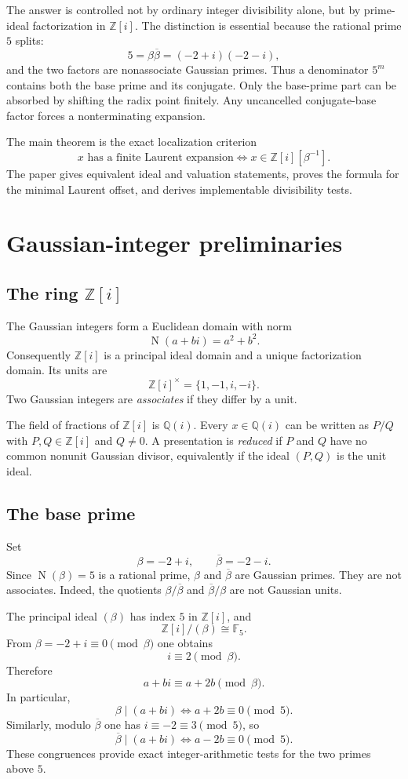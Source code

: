 \documentclass[11pt]{article}
\theoremstyle{definition}
\newcommand{\Zi}{\mathbb{Z}[i]}
\newcommand{\Qi}{\mathbb{Q}(i)}
\newcommand{\Ffive}{\mathbb{F}_5}
\newcommand{\Norm}{\operatorname{N}}
\begin{document}
The answer is controlled not by ordinary integer divisibility alone, but by prime-ideal factorization in $\Zi$.  The distinction is essential because the rational prime $5$ splits:
\[
5=\beta\overline\beta=(-2+i)(-2-i),
\]
and the two factors are nonassociate Gaussian primes.  Thus a denominator $5^m$ contains both the base prime and its conjugate.  Only the base-prime part can be absorbed by shifting the radix point finitely.  Any uncancelled conjugate-base factor forces a nonterminating expansion.

The main theorem is the exact localization criterion
\[
\boxed{
 x\text{ has a finite Laurent expansion}
 \iff
 x\in\Zi[\beta^{-1}].
}
\]
The paper gives equivalent ideal and valuation statements, proves the formula for the minimal Laurent offset, and derives implementable divisibility tests.

\section{Gaussian-integer preliminaries}

\subsection{The ring $\Zi$}

The Gaussian integers form a Euclidean domain with norm
\[
\Norm(a+bi)=a^2+b^2.
\]
Consequently $\Zi$ is a principal ideal domain and a unique factorization domain.  Its units are
\[
\Zi^{\times}=\{1,-1,i,-i\}.
\]
Two Gaussian integers are \emph{associates} if they differ by a unit.

The field of fractions of $\Zi$ is $\Qi$.  Every $x\in\Qi$ can be written as $P/Q$ with $P,Q\in\Zi$ and $Q\neq0$.  A presentation is \emph{reduced} if $P$ and $Q$ have no common nonunit Gaussian divisor, equivalently if the ideal $(P,Q)$ is the unit ideal.

\subsection{The base prime}

Set
\[
\beta=-2+i,
\qquad
\overline\beta=-2-i.
\]
Since $\Norm(\beta)=5$ is a rational prime, $\beta$ and $\overline\beta$ are Gaussian primes.  They are not associates.  Indeed, the quotients $\beta/\overline\beta$ and $\overline\beta/\beta$ are not Gaussian units.

The principal ideal $(\beta)$ has index $5$ in $\Zi$, and
\[
\Zi/(\beta)\cong\Ffive.
\]
From $\beta=-2+i\equiv0\pmod\beta$ one obtains
\[
i\equiv2\pmod\beta.
\]
Therefore
\[
a+bi\equiv a+2b\pmod\beta.
\]
In particular,
\begin{equation}
\beta\mid(a+bi)
\iff
a+2b\equiv0\pmod5.
\label{eq:beta-divisibility}
\end{equation}
Similarly, modulo $\overline\beta$ one has $i\equiv-2\equiv3\pmod5$, so
\begin{equation}
\overline\beta\mid(a+bi)
\iff
a-2b\equiv0\pmod5.
\label{eq:betabar-divisibility}
\end{equation}
These congruences provide exact integer-arithmetic tests for the two primes above $5$.
\end{document}
